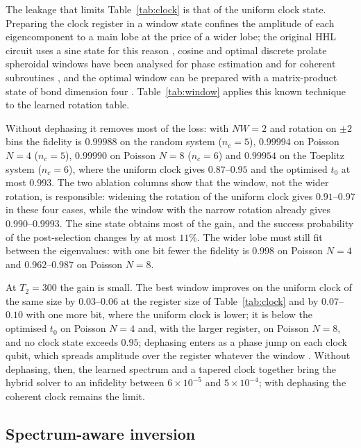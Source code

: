 \documentclass[journal]{IEEEtran}
\begin{document}
The leakage that limits Table~\ref{tab:clock} is that of the uniform clock state. Preparing the clock register in a window state confines the amplitude of each eigencomponent to a main lobe at the price of a wider lobe; the original HHL circuit uses a sine state for this reason \cite{HHL2009}, cosine and optimal discrete prolate spheroidal windows have been analysed for phase estimation \cite{Rendon2022,Patel2026,Kristjuhan2026,Pelofske2026} and for coherent subroutines \cite{Apel2025}, and the optimal window can be prepared with a matrix-product state of bond dimension four \cite{Kristjuhan2026}. Table~\ref{tab:window} applies this known technique to the learned rotation table.

Without dephasing it removes most of the loss: with $NW=2$ and rotation on $\pm2$ bins the fidelity is $0.99988$ on the random system ($n_c=5$), $0.99994$ on Poisson $N=4$ ($n_c=5$), $0.99990$ on Poisson $N=8$ ($n_c=6$) and $0.99954$ on the Toeplitz system ($n_c=6$), where the uniform clock gives $0.87$--$0.95$ and the optimised $t_0$ at most $0.993$. The two ablation columns show that the window, not the wider rotation, is responsible: widening the rotation of the uniform clock gives $0.91$--$0.97$ in these four cases, while the window with the narrow rotation already gives $0.990$--$0.9993$. The sine state obtains most of the gain, and the success probability of the post-selection changes by at most $11\%$. The wider lobe must still fit between the eigenvalues: with one bit fewer the fidelity is $0.998$ on Poisson $N=4$ and $0.962$--$0.987$ on Poisson $N=8$.

At $T_2=300$ the gain is small. The best window improves on the uniform clock of the same size by $0.03$--$0.06$ at the register size of Table~\ref{tab:clock} and by $0.07$--$0.10$ with one more bit, where the uniform clock is lower; it is below the optimised $t_0$ on Poisson $N=4$ and, with the larger register, on Poisson $N=8$, and no clock state exceeds $0.95$; dephasing enters as a phase jump on each clock qubit, which spreads amplitude over the register whatever the window \cite{Gordeichuk2026}. Without dephasing, then, the learned spectrum and a tapered clock together bring the hybrid solver to an infidelity between $6\times10^{-5}$ and $5\times10^{-4}$; with dephasing the coherent clock remains the limit.

\subsection{Spectrum-aware inversion}
\label{sec:inv}
\end{document}
